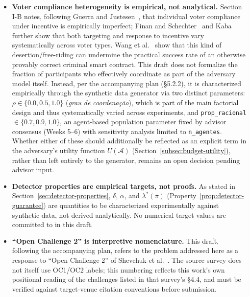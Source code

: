 \documentclass[journal,onecolumn,11pt]{IEEEtran}
\begin{document}
\begin{itemize}
  \item \textbf{Voter compliance heterogeneity is empirical, not
analytical.} Section I-B notes, following Guerra and
Justesen~\cite{guerra2022votebuying}, that individual voter compliance
under incentive is empirically imperfect; Finan and
Schechter~\cite{finan2011votebuying} and Kaba~\cite{kaba2022votebuying}
further show that both targeting and response to incentive vary
systematically across voter types. Wang et al.~\cite{wang2019randomness}
show that this kind of desertion/free-riding can undermine the practical
success rate of an otherwise provably correct criminal smart contract. This draft does
not formalize the fraction of participants who effectively coordinate as
part of the adversary model itself. Instead, per the accompanying plan
(\S5.2.2), it is characterized empirically through the synthetic data
generator via two distinct parameters: $\rho \in \{0.0, 0.5, 1.0\}$
(\emph{grau de coordenação}), which is part of the main factorial design
and thus systematically varied across experiments, and
\texttt{prop\_racional} $\in \{0.7, 0.9, 1.0\}$, an agent-based population
parameter fixed by advisor consensus (Weeks 5--6) with sensitivity
analysis limited to \texttt{n\_agentes}. Whether either of these should
additionally be reflected as an explicit term in the adversary's utility
function $U(\mathcal{A})$ (Section~\ref{subsec:budget-utility}), rather
than left entirely to the generator, remains an open decision pending
advisor input.

  \item \textbf{Detector properties are empirical targets, not proofs.} As
        stated in Section~\ref{sec:detector-properties}, $\delta$, $\alpha$,
        and $\lambda^*(\pi)$ (Property~\ref{prop:detector-guarantee}) are
        quantities to be characterized experimentally against synthetic
        data, not derived analytically. No numerical target values are
        committed to in this draft.

  \item \textbf{``Open Challenge 2'' is interpretive nomenclature.} This
        draft, following the accompanying plan, refers to the problem
        addressed here as a response to ``Open Challenge 2'' of
        Shevchuk et al.~\cite{shevchuk2025anomaly}. The source survey does
        not itself use OC1/OC2 labels; this numbering reflects this work's
        own positional reading of the challenges listed in that survey's
        \S4.4, and must be verified against target-venue citation
        conventions before submission.


\end{itemize}
\end{document}
